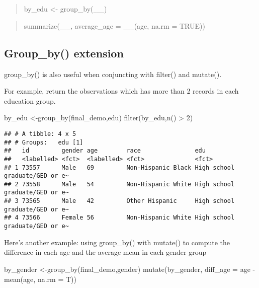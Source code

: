 \documentclass[
]{book}
\newenvironment{Shaded}{\begin{snugshade}}{\end{snugshade}}
\newcommand{\AttributeTok}[1]{\textcolor[rgb]{0.77,0.63,0.00}{#1}}
\newcommand{\DecValTok}[1]{\textcolor[rgb]{0.00,0.00,0.81}{#1}}
\newcommand{\FunctionTok}[1]{\textcolor[rgb]{0.00,0.00,0.00}{#1}}
\newcommand{\NormalTok}[1]{#1}
\newcommand{\OtherTok}[1]{\textcolor[rgb]{0.56,0.35,0.01}{#1}}
\newcommand{\SpecialCharTok}[1]{\textcolor[rgb]{0.00,0.00,0.00}{#1}}
\begin{document}
\begin{quote}
by\_edu \textless- group\_by(\texttt{\_\_\_})
\end{quote}

\begin{quote}
summarize(\texttt{\_\_\_}, average\_age = \texttt{\_\_\_}(age, na.rm = TRUE))
\end{quote}

\hypertarget{group_by-extension}{%
\subsection{Group\_by() extension}\label{group_by-extension}}

group\_by() is also useful when conjuncting with filter() and mutate().

For example, return the observations which has more than 2 records in each education group.

\begin{Shaded}
\begin{Highlighting}[]
\NormalTok{by\_edu }\OtherTok{\textless{}{-}}\FunctionTok{group\_by}\NormalTok{(final\_demo,edu)}
\FunctionTok{filter}\NormalTok{(by\_edu,}\FunctionTok{n}\NormalTok{() }\SpecialCharTok{\textgreater{}} \DecValTok{2}\NormalTok{)}
\end{Highlighting}
\end{Shaded}

\begin{verbatim}
## # A tibble: 4 x 5
## # Groups:   edu [1]
##   id         gender age        race               edu
##   <labelled> <fct>  <labelled> <fct>              <fct>
## 1 73557      Male   69         Non-Hispanic Black High school graduate/GED or e~
## 2 73558      Male   54         Non-Hispanic White High school graduate/GED or e~
## 3 73565      Male   42         Other Hispanic     High school graduate/GED or e~
## 4 73566      Female 56         Non-Hispanic White High school graduate/GED or e~
\end{verbatim}

Here's another example: using group\_by() with mutate() to compute the difference in each age and the average mean in each gender group

\begin{Shaded}
\begin{Highlighting}[]
\NormalTok{by\_gender }\OtherTok{\textless{}{-}}\FunctionTok{group\_by}\NormalTok{(final\_demo,gender)}
\FunctionTok{mutate}\NormalTok{(by\_gender,}
      \AttributeTok{diff\_age =}\NormalTok{ age }\SpecialCharTok{{-}} \FunctionTok{mean}\NormalTok{(age, }\AttributeTok{na.rm =}\NormalTok{ T))}
\end{Highlighting}
\end{Shaded}
\end{document}
